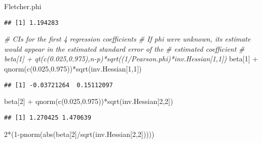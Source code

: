 \documentclass[
]{book}
\newenvironment{Shaded}{\begin{snugshade}}{\end{snugshade}}
\newcommand{\CommentTok}[1]{\textcolor[rgb]{0.56,0.35,0.01}{\textit{#1}}}
\newcommand{\DecValTok}[1]{\textcolor[rgb]{0.00,0.00,0.81}{#1}}
\newcommand{\FloatTok}[1]{\textcolor[rgb]{0.00,0.00,0.81}{#1}}
\newcommand{\FunctionTok}[1]{\textcolor[rgb]{0.00,0.00,0.00}{#1}}
\newcommand{\NormalTok}[1]{#1}
\newcommand{\SpecialCharTok}[1]{\textcolor[rgb]{0.00,0.00,0.00}{#1}}
\begin{document}
\begin{Shaded}
\begin{Highlighting}[]
\NormalTok{Fletcher.phi }
\end{Highlighting}
\end{Shaded}

\begin{verbatim}
## [1] 1.194283
\end{verbatim}

\begin{Shaded}
\begin{Highlighting}[]
\CommentTok{\# CIs for the first 4 regression coefficients}
\CommentTok{\#   If phi were unknown, it\textquotesingle{}s estimate would appear in the estimated standard error of the }
\CommentTok{\#   estimated coefficient}
\CommentTok{\# beta[1] + qt(c(0.025,0.975),n{-}p)*sqrt((1/Pearson.phi)*inv.Hessian[1,1])}
\NormalTok{beta[}\DecValTok{1}\NormalTok{] }\SpecialCharTok{+} \FunctionTok{qnorm}\NormalTok{(}\FunctionTok{c}\NormalTok{(}\FloatTok{0.025}\NormalTok{,}\FloatTok{0.975}\NormalTok{))}\SpecialCharTok{*}\FunctionTok{sqrt}\NormalTok{(inv.Hessian[}\DecValTok{1}\NormalTok{,}\DecValTok{1}\NormalTok{])}
\end{Highlighting}
\end{Shaded}

\begin{verbatim}
## [1] -0.03721264  0.15112097
\end{verbatim}

\begin{Shaded}
\begin{Highlighting}[]
\NormalTok{beta[}\DecValTok{2}\NormalTok{] }\SpecialCharTok{+} \FunctionTok{qnorm}\NormalTok{(}\FunctionTok{c}\NormalTok{(}\FloatTok{0.025}\NormalTok{,}\FloatTok{0.975}\NormalTok{))}\SpecialCharTok{*}\FunctionTok{sqrt}\NormalTok{(inv.Hessian[}\DecValTok{2}\NormalTok{,}\DecValTok{2}\NormalTok{])}
\end{Highlighting}
\end{Shaded}

\begin{verbatim}
## [1] 1.270425 1.470639
\end{verbatim}

\begin{Shaded}
\begin{Highlighting}[]
\DecValTok{2}\SpecialCharTok{*}\NormalTok{(}\DecValTok{1}\SpecialCharTok{{-}}\FunctionTok{pnorm}\NormalTok{(}\FunctionTok{abs}\NormalTok{(beta[}\DecValTok{2}\NormalTok{]}\SpecialCharTok{/}\FunctionTok{sqrt}\NormalTok{(inv.Hessian[}\DecValTok{2}\NormalTok{,}\DecValTok{2}\NormalTok{]))))}
\end{Highlighting}
\end{Shaded}
\end{document}
